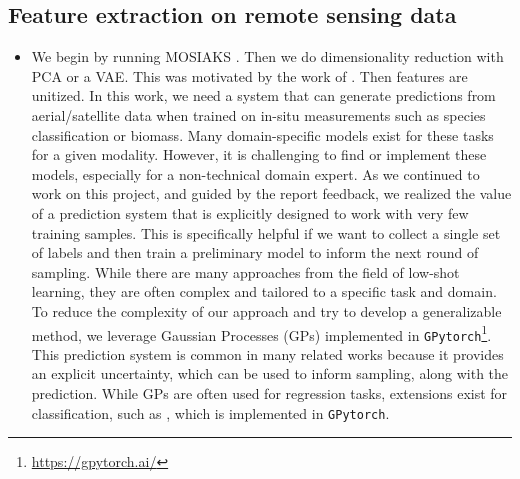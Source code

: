 \subsection{Feature extraction on remote sensing data}
\begin{itemize}
    \item We begin by running MOSIAKS \cite{Rolf2021}. Then we do dimensionality reduction with PCA or a VAE. This was motivated by the work of \cite{Candela2020PlanetaryMapping}. Then features are unitized. 
    In this work, we need a system that can generate predictions from aerial/satellite data when trained on in-situ measurements such as species classification or biomass. Many domain-specific models exist for these tasks for a given modality. However, it is challenging to find or implement these models, especially for a non-technical domain expert. 
    As we continued to work on this project, and guided by the report feedback, we realized the value of a prediction system that is explicitly designed to work with very few training samples. This is specifically helpful if we want to collect a single set of labels and then train a preliminary model to inform the next round of sampling. While there are many approaches from the field of low-shot learning, they are often complex and tailored to a specific task and domain. To reduce the complexity of our approach and try to develop a generalizable method, we leverage Gaussian Processes (GPs) \cite{books/lib/RasmussenW06}implemented in \texttt{GPytorch}\footnote{\url{https://gpytorch.ai/}}. This prediction system is common in many related works because it provides an explicit uncertainty, which can be used to inform sampling, along with the prediction. While GPs are often used for regression tasks, extensions exist for classification, such as \cite{milios2018dirichletbased}, which is implemented in \texttt{GPytorch}.


\end{itemize}
